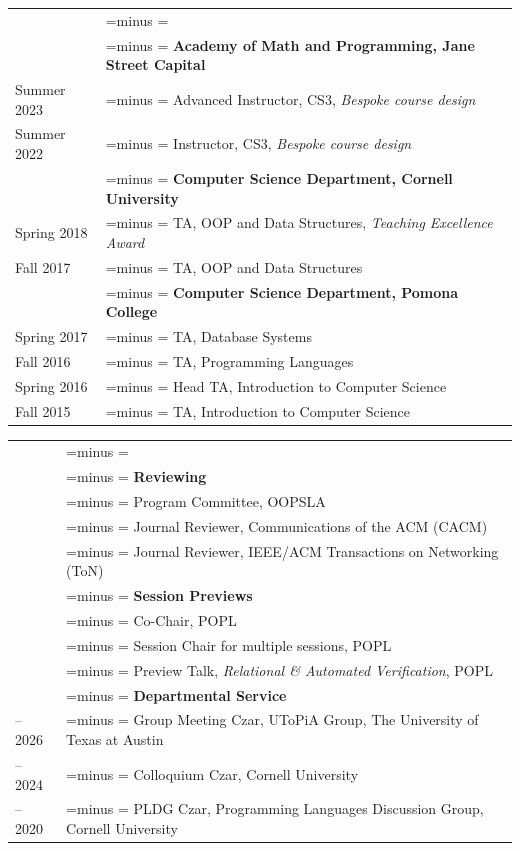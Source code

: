 \documentclass[letterpaper,10pt,oneside]{article}
\makeatletter
\newlength{\leftcol}  \setlength{\leftcol}{1.05in}
\newlength{\colsep}   \setlength{\colsep}{1em}
\newlength{\rightcol}
\newcommand{\balancedrag}{%
  \setlength{\rightskip}{0pt plus 0.45\rightcol}%
  \setlength{\parfillskip}{0pt}%
  \spaceskip=\fontdimen2\font minus \fontdimen4\font
  \xspaceskip=\spaceskip
  \hbadness=10000 \hyphenpenalty=10000 \exhyphenpenalty=10000 \emergencystretch=0pt}
\newenvironment{cvsection}[1]
  {\par\vspace{0.9em}%
   \setlength{\rightcol}{\dimexpr\linewidth-\leftcol-\colsep\relax}%
   \noindent\begin{longtable}[l]{@{}>{\raggedleft\arraybackslash}p{\leftcol}@{\hspace{\colsep}}>{\raggedright\balancedrag\arraybackslash}p{\rightcol}@{}}
   \multicolumn{2}{@{}l}{\Large #1} \\*\noalign{\nobreak\vspace{0.4em}}}
  {\end{longtable}}
\newcommand{\gap}{\noalign{\vspace{0.4em}}}
\makeatother
\begin{document}

\begin{cvsection}{Teaching}
  \noalign{\vspace{-1.1em}}
  & \textbf{Academy of Math and Programming, Jane Street Capital} \\*
  Summer 2023 & Advanced Instructor, CS3, \textit{Bespoke course design} \\*
  Summer 2022 & Instructor, CS3, \textit{Bespoke course design} \\
  \gap
  & \textbf{Computer Science Department, Cornell University} \\*
  Spring 2018 & TA, OOP and Data Structures, \textit{Teaching Excellence Award} \\*
  Fall 2017 & TA, OOP and Data Structures \\
  \gap
  & \textbf{Computer Science Department, Pomona College} \\*
  Spring 2017 & TA, Database Systems \\*
  Fall 2016 & TA, Programming Languages \\*
  Spring 2016 & Head TA, Introduction to Computer Science \\*
  Fall 2015 & TA, Introduction to Computer Science \\
\end{cvsection}


\begin{cvsection}{Service}
  \noalign{\vspace{-1.1em}}
  & \textbf{Reviewing} \\*
  2026 & Program Committee, OOPSLA \\*
  2023 & Journal Reviewer, Communications of the ACM (CACM) \\*
  2022 & Journal Reviewer, IEEE/ACM Transactions on Networking (ToN) \\
  \gap
  & \textbf{Session Previews} \\*
  2023 & Co-Chair, POPL \\*
  2023 & Session Chair for multiple sessions, POPL \\*
  2023 & Preview Talk, \emph{Relational \& Automated Verification}, POPL \\
  \gap
  & \textbf{Departmental Service} \\*
  2024 -- 2026 & Group Meeting Czar, UToPiA Group, The University of Texas at Austin \\*
  2017 -- 2024 & Colloquium Czar, Cornell University \\*
  2018 -- 2020 & PLDG Czar, Programming Languages Discussion Group, Cornell University \\
\end{cvsection}
\end{document}
